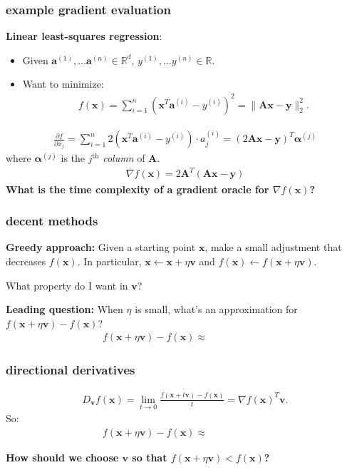 \documentclass[compress]{beamer}
\newcommand{\bs}[1]{\boldsymbol{#1}}
\newcommand{\bv}[1]{\mathbf{#1}}
\newcommand{\R}{\mathbb{R}}
\begin{document}
\begin{frame}[t]
	\frametitle{example gradient evaluation}
	\textbf{Linear least-squares regression}:
	\begin{itemize}
		\item Given $\bv{a}^{(1)}, \ldots \bv{a}^{(n)} \in \R^d$, ${y}^{(1)}, \ldots {y}^{(n)} \in \R$.
		\item Want to minimize:
		\begin{align*}
			f(\bv{x}) = \sum_{i=1}^n \left(\bv{x}^T\bv{a}^{(i)} - {y}^{(i)}\right)^2 = \|\bv{A}\bv{x} - \bv{y}\|_2^2.
		\end{align*} 
	\end{itemize}
	
	\begin{align*}
		\frac{\partial f}{\partial x_j} = \sum_{i=1}^n 2\left(\bv{x}^T\bv{a}^{(i)} - {y}^{(i)}\right)\cdot a^{(i)}_j = (2\bv{A}\bv{x} -\bv{y})^T\bs{\alpha}^{(j)}
	\end{align*}
	where $\bs{\alpha}^{(j)}$ is the $j^\text{th}$ \emph{column} of $\bv{A}$. 
	\begin{align*}
		\nabla f(\bv{x}) = 2\bv{A}^T\left(\bv{A}\bv{x} - \bv{y}\right)
	\end{align*}
	\textbf{What is the time complexity of a gradient oracle for $\nabla f(\bv{x})$?}
\end{frame}

\begin{frame}
	\frametitle{decent methods}
	\textbf{Greedy approach:} Given a starting point $\bv{x}$, make a small adjustment that decreases $f(\bv{x})$. In particular, $\bv{x} \leftarrow \bv{x} + \eta\bv{v}$ and $f(\bv{x}) \leftarrow f(\bv{x} + \eta\bv{v})$.
	
	\begin{center}
		\alert{What property do I want in $\bv{v}$?}
	\end{center}
	
	
	\textbf{Leading question:} When $\eta$ is small, what's an approximation for $f(\bv{x} + \eta\bv{v}) - f(\bv{x})$?
	\begin{align*}
		f(\bv{x} + \eta\bv{v}) - f(\bv{x}) \approx \hspace{6em}
	\end{align*}
	
	
\end{frame}

\begin{frame}[t]
	\frametitle{directional derivatives}
	
	\begin{align*}
		D_\bv{v}f(\bv{x}) = \lim_{t\rightarrow 0} \frac{f(\bv{x} + t\bv{v}) - f(\bv{x})}{t} = \nabla f(\bv{x})^T \bv{v}.
	\end{align*}	
	So:
	\begin{align*}
		f(\bv{x} + \eta\bv{v}) - f(\bv{x}) \approx \hspace{6em}
	\end{align*}
	
	\textbf{How should we choose $\bv{v}$ so that $f(\bv{x} + \eta\bv{v}) < f(\bv{x})$?} 
	
\end{frame}
\end{document}
